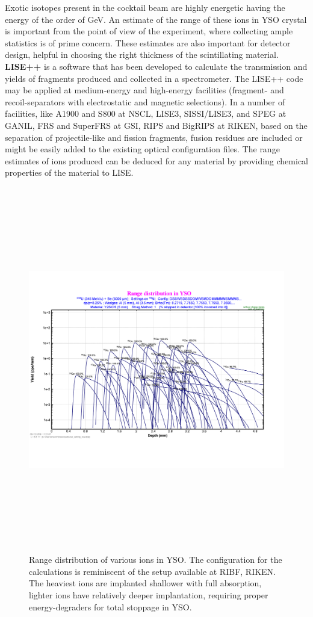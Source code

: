 Exotic isotopes present in the cocktail beam are highly energetic having the energy of the order of GeV. An estimate of the range of these ions in YSO crystal is important from the point of view of the experiment, where collecting ample statistics is of prime concern. These estimates are also important for detector design, helpful in choosing the right thickness of the scintillating material. \textbf{LISE++} \citep{lise} is a software that has been developed to calculate the transmission and yields of fragments produced and collected in a spectrometer. The LISE++ code may be applied at medium-energy and high-energy facilities (fragment- and recoil-separators with electrostatic and magnetic selections). In a number of facilities, like A1900 and S800 at NSCL, LISE3, SISSI/LISE3, and SPEG at GANIL, FRS and SuperFRS at GSI,  RIPS and BigRIPS at RIKEN, based on the separation of projectile-like and fission fragments,  fusion residues are included or might be easily added to the existing optical configuration files. The range estimates of ions produced can be deduced for any material by providing chemical properties of the material to LISE.
\newpage
\begin{figure}[h]
	\centering
	\includegraphics[height=16cm, width=17cm]{figures/yso_lise_snapshot-rotated.pdf}
	\caption[Range distribution of various ions in YSO]{Range distribution of various ions in YSO. The configuration for the calculations is reminiscent of the setup available at RIBF, RIKEN. The heaviest ions are implanted shallower with full absorption, lighter ions have relatively deeper implantation, requiring proper energy-degraders for total stoppage in YSO. }
	\label{fig:ionrangeyso}
\end{figure}

